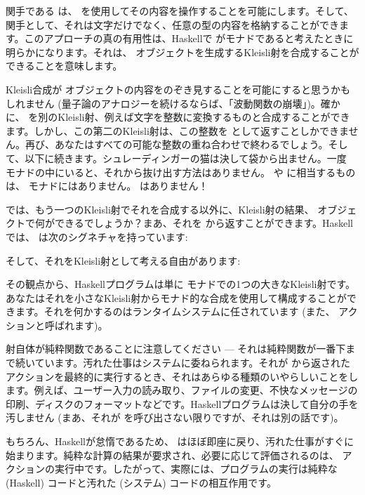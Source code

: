 関手である  は、 を使用してその内容を操作することを可能にします。そして、関手として、それは文字だけでなく、任意の型の内容を格納することができます。このアプローチの真の有用性は、Haskellで  がモナドであると考えたときに明らかになります。それは、 オブジェクトを生成するKleisli射を合成することができることを意味します。

Kleisli合成が  オブジェクトの内容をのぞき見することを可能にすると思うかもしれません (量子論のアナロジーを続けるならば、「波動関数の崩壊」)。確かに、 を別のKleisli射、例えば文字を整数に変換するものと合成することができます。しかし、この第二のKleisli射は、この整数を  として返すことしかできません。再び、あなたはすべての可能な整数の重ね合わせで終わるでしょう。そして、以下に続きます。シュレーディンガーの猫は決して袋から出ません。一度  モナドの中にいると、それから抜け出す方法はありません。  や  に相当するものは、 モナドにはありません。 はありません！

では、もう一つのKleisli射でそれを合成する以外に、Kleisli射の結果、 オブジェクトで何ができるでしょうか？まあ、それを  から返すことができます。Haskellでは、 は次のシグネチャを持っています: 

そして、それをKleisli射として考える自由があります: 

その観点から、Haskellプログラムは単に  モナドでの1つの大きなKleisli射です。あなたはそれを小さなKleisli射からモナド的な合成を使用して構成することができます。それを何かするのはランタイムシステムに任されています (また、 アクションと呼ばれます)。

射自体が純粋関数であることに注意してください --- それは純粋関数が一番下まで続いています。汚れた仕事はシステムに委ねられます。それが  から返された  アクションを最終的に実行するとき、それはあらゆる種類のいやらしいことをします。例えば、ユーザー入力の読み取り、ファイルの変更、不快なメッセージの印刷、ディスクのフォーマットなどです。Haskellプログラムは決して自分の手を汚しません (まあ、それが  を呼び出さない限りですが、それは別の話です)。

もちろん、Haskellが怠惰であるため、 はほぼ即座に戻り、汚れた仕事がすぐに始まります。純粋な計算の結果が要求され、必要に応じて評価されるのは、 アクションの実行中です。したがって、実際には、プログラムの実行は純粋な (Haskell) コードと汚れた (システム) コードの相互作用です。

